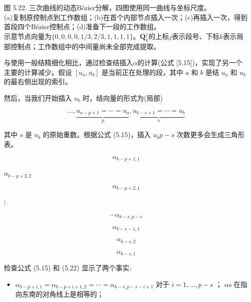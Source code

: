 \documentclass[../main.tex]{subfiles}
\begin{document}
\begin{center}
\begin{minipage}{28cm}
\vspace*{.6\baselineskip}
\centering
{}
\par\medskip
{}
\par\smallskip
图 5.22. 三次曲线的动态Bézier分解，四图使用同一曲线与坐标尺度。\\
(a)复制原控制点到工作数组；(b)在首个内部节点插入一次；(c)再插入一次，得到首段四个Bézier控制点；(d)准备下一段的工作数组。\\
示意节点向量为$\{0,0,0,0,1/3,2/3,1,1,1,1\}$。$\mathbf Q_k^j$的上标$j$表示段号、下标$k$表示局部控制点；工作数组中的中间量尚未全部完成提取。
\end{minipage}
\end{center}

与使用一般结精细化相比，通过检查结插入\(\alpha\)的计算(公式 [5.15])，实现了另一个主要的计算减少。假设 \(\left\lbrack  {{u}_{a},{u}_{b}}\right\rbrack\) 是当前正在处理的段，其中 \(a\) 和 \(b\) 是结 \({u}_{a}\) 和 \({u}_{b}\) 的最右侧出现的索引。



然后，当我们开始插入 \({u}_{b}\) 时，结向量的形式为(局部)

\[
\ldots ,\underset{p}{\underbrace{{u}_{a - p + 1} = \cdots  = {u}_{a}}},\underset{s}{\underbrace{{u}_{b - s + 1} = \cdots  = {u}_{b}}} \tag{5.22}
\]





其中 \(s\) 是 \({u}_{b}\) 的原始重数。根据公式 (5.15)，插入 \({u}_{b}p - s\) 次数更多会生成三角形表。

\[
{\alpha }_{b - p + 1,1}
\]

\({\alpha }_{b - p + 2,2}\)

\[
{\alpha }_{b - p + 2,1}
\]

\(\vdots\)

\[
\cdots {\alpha }_{b - s,p - s}
\]

\[
{\alpha }_{b - s - 1,1}
\]

\[
{\alpha }_{b - s,2}
\]

\[
{\alpha }_{b - s,1}
\]

检查公式 (5.15) 和 (5.22) 显示了两个事实:

\begin{itemize}
\item \({\alpha }_{b - p + i,1} = {\alpha }_{b - p + i + 1,2} = \cdots  = {\alpha }_{b - s,p - s - i + 1}\) 对于 \(i = 1,\ldots ,p - s\) ； \(\alpha \mathrm{s}\) 在指向东南的对角线上是相等的；
\end{itemize}
\end{document}
